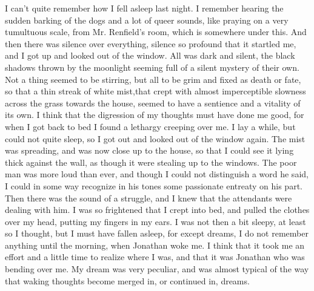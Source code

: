 I can't quite remember how I fell asleep last night. I remember hearing the sudden barking of the dogs and a lot of queer sounds, like praying on a very tumultuous scale, from Mr. Renfield's room, which is somewhere under this. And then there was silence over everything, silence so profound that it startled me, and I got up and looked out of the window. All was dark and silent, the black shadows thrown by the moonlight seeming full of a silent mystery of their own. Not a thing seemed to be stirring, but all to be grim and fixed as death or fate, so that a thin streak of white mist,that crept with almost imperceptible slowness across the grass towards the house, seemed to have a sentience and a vitality of its own. I think that the digression of my thoughts must have done me good, for when I got back to bed I found a lethargy creeping over me. I lay a while, but could not quite sleep, so I got out and looked out of the window again. The mist was spreading, and was now close up to the house, so that I could see it lying thick against the wall, as though it were stealing up to the windows. The poor man was more loud than ever, and though I could not distinguish a word he said, I could in some way recognize in his tones some passionate entreaty on his part. Then there was the sound of a struggle, and I knew that the attendants were dealing with him. I was so frightened that I crept into bed, and pulled the clothes over my head, putting my fingers in my ears. I was not then a bit sleepy, at least so I thought, but I must have fallen asleep, for except dreams, I do not remember anything until the morning, when Jonathan woke me. I think that it took me an effort and a little time to realize where I was, and that it was Jonathan who was bending over me. My dream was very peculiar, and was almost typical of the way that waking thoughts become merged in, or continued in, dreams. 

